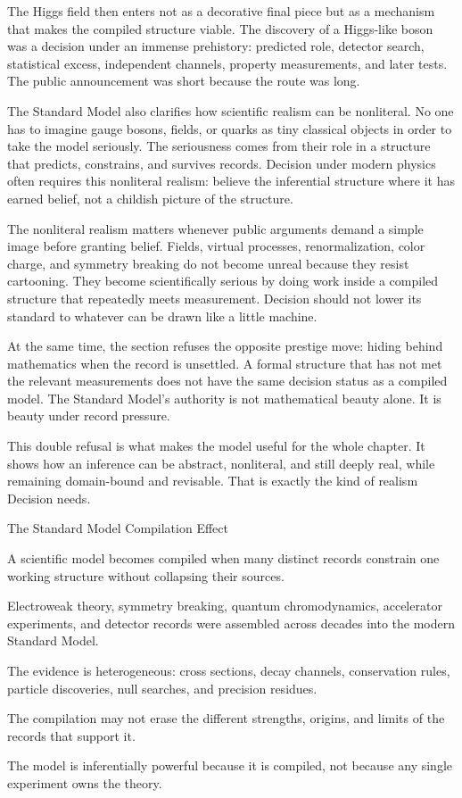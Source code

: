 The Higgs field then enters not as a decorative final piece but as a mechanism
that makes the compiled structure viable. The discovery of a Higgs-like boson
was a decision under an immense prehistory: predicted role, detector search,
statistical excess, independent channels, property measurements, and later
tests. The public announcement was short because the route was long.

The Standard Model also clarifies how scientific realism can be nonliteral.
No one has to imagine gauge bosons, fields, or quarks as tiny classical
objects in order to take the model seriously. The seriousness comes from
their role in a structure that predicts, constrains, and survives records.
Decision under modern physics often requires this nonliteral realism:
believe the inferential structure where it has earned belief, not a childish
picture of the structure.

The nonliteral realism matters whenever public arguments demand a simple
image before granting belief. Fields, virtual processes, renormalization,
color charge, and symmetry breaking do not become unreal because they resist
cartooning. They become scientifically serious by doing work inside a
compiled structure that repeatedly meets measurement. Decision should not
lower its standard to whatever can be drawn like a little machine.

At the same time, the section refuses the opposite prestige move: hiding
behind mathematics when the record is unsettled. A formal structure that has
not met the relevant measurements does not have the same decision status as a
compiled model. The Standard Model's authority is not mathematical beauty
alone. It is beauty under record pressure.

This double refusal is what makes the model useful for the whole chapter. It
shows how an inference can be abstract, nonliteral, and still deeply real,
while remaining domain-bound and revisable. That is exactly the kind of
realism Decision needs.

\begin{phenom}{The Standard Model Compilation Effect~\cite{glashow1961,higgs1964,weinberg1967,gross1973,politzer1973}}
\label{ph:standard-model-compilation}

\PhStatement
A scientific model becomes compiled when many distinct records constrain one
working structure without collapsing their sources.

\PhOrigin
Electroweak theory, symmetry breaking, quantum chromodynamics, accelerator
experiments, and detector records were assembled across decades into the
modern Standard Model.

\PhObservation
The evidence is heterogeneous: cross sections, decay channels, conservation
rules, particle discoveries, null searches, and precision residues.

\PhConstraint
The compilation may not erase the different strengths, origins, and limits of
the records that support it.

\PhConsequence
The model is inferentially powerful because it is compiled, not because any
single experiment owns the theory.
\end{phenom}


